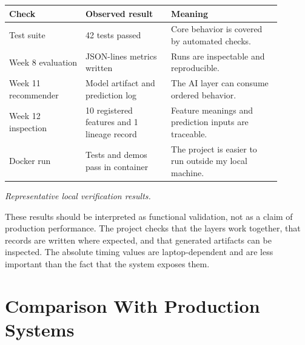 \begin{center}
\footnotesize
\setlength{\tabcolsep}{4pt}
\renewcommand{\arraystretch}{0.95}
\begin{tabular}{p{0.25\linewidth} p{0.28\linewidth} p{0.36\linewidth}}
\toprule
\textbf{Check} & \textbf{Observed result} & \textbf{Meaning} \\
\midrule
Test suite & 42 tests passed & Core behavior is covered by automated checks. \\
Week 8 evaluation & JSON-lines metrics written & Runs are inspectable and reproducible. \\
Week 11 recommender & Model artifact and prediction log & The AI layer can consume ordered behavior. \\
Week 12 inspection & 10 registered features and 1 lineage record & Feature meanings and prediction inputs are traceable. \\
Docker run & Tests and demos pass in container & The project is easier to run outside my local machine. \\
\bottomrule
\end{tabular}
\vspace{0.2cm}
\textit{Representative local verification results.}
\end{center}

These results should be interpreted as functional validation, not as a claim of
production performance. The project checks that the layers work together, that
records are written where expected, and that generated artifacts can be
inspected. The absolute timing values are laptop-dependent and are less
important than the fact that the system exposes them.

\section{Comparison With Production Systems}\label{sec:comparison}

